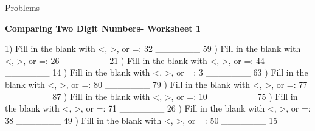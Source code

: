 \documentclass{article}%
\begin{document}
%
\huge%
\vspace*{\fill}%
\begin{center}%
Problems%
\end{center}%
\vspace*{\fill}%
\pagebreak%
\normalsize%
\large%
\begin{center}%
\textbf{Comparing Two Digit Numbers- Worksheet 1}%
\newline%
\newline%
\newline%
\end{center} \normalsize%
1) Fill in the blank with <, >, or =: 32 \_\_\_\_\_\_\_ 59%
\newline%
\newline%
) Fill in the blank with <, >, or =: 26 \_\_\_\_\_\_\_ 21%
\newline%
\newline%
) Fill in the blank with <, >, or =: 44 \_\_\_\_\_\_\_ 14%
\newline%
\newline%
) Fill in the blank with <, >, or =: 3 \_\_\_\_\_\_\_ 63%
\newline%
\newline%
) Fill in the blank with <, >, or =: 80 \_\_\_\_\_\_\_ 79%
\newline%
\newline%
) Fill in the blank with <, >, or =: 77 \_\_\_\_\_\_\_ 87%
\newline%
\newline%
) Fill in the blank with <, >, or =: 10 \_\_\_\_\_\_\_ 75%
\newline%
\newline%
) Fill in the blank with <, >, or =: 71 \_\_\_\_\_\_\_ 26%
\newline%
\newline%
) Fill in the blank with <, >, or =: 38 \_\_\_\_\_\_\_ 49%
\newline%
\newline%
) Fill in the blank with <, >, or =: 50 \_\_\_\_\_\_\_ 15%
\newline%
\newline%
\end{document}
